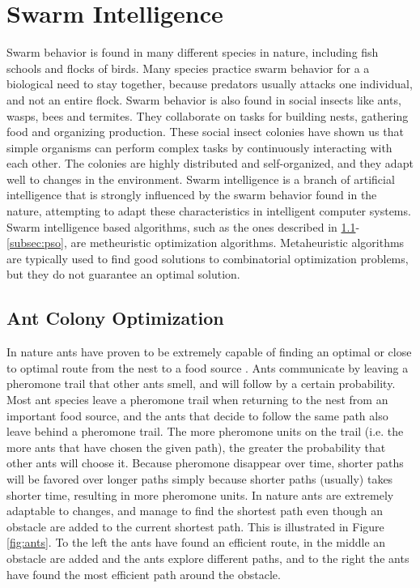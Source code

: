 \section{Swarm Intelligence}
\label{sec:swarmIntelligence}
Swarm behavior is found in many different species in nature, including fish schools and flocks of birds. Many species practice swarm behavior for a a biological need to stay together, because predators usually attacks one individual, and not an entire flock. Swarm behavior is also found in social insects like ants, wasps, bees and termites. They collaborate on tasks for building nests, gathering food and organizing production. These social insect colonies have shown us that simple organisms can perform complex tasks by continuously interacting with each other. The colonies are highly distributed and self-organized, and they adapt well to changes in the environment. Swarm intelligence \citep{beni89} is a branch of artificial intelligence that is strongly influenced by the swarm behavior found in the nature, attempting to adapt these characteristics in intelligent computer systems. Swarm intelligence based algorithms, such as the ones described in \ref{subsec:aco}-\ref{subsec:pso}, are metheuristic optimization algorithms. Metaheuristic algorithms are typically used to find good solutions to combinatorial optimization problems, but they do not guarantee an optimal solution. 

\subsection{Ant Colony Optimization}
\label{subsec:aco}
In nature ants have proven to be extremely capable of finding an optimal or close to optimal route from the nest to a food source \citep{deneubourg90}. Ants communicate by leaving a pheromone trail that other ants smell, and will follow by a certain probability. Most ant species leave a pheromone trail when returning to the nest from an important food source, and the ants that decide to follow the same path also leave behind a pheromone trail. The more pheromone units on the trail (i.e. the more ants that have chosen the given path), the greater the probability that other ants will choose it. Because pheromone disappear over time, shorter paths will be favored over longer paths simply because shorter paths (usually) takes shorter time, resulting in more pheromone units. In nature ants are extremely adaptable to changes, and manage to find the shortest path even though an obstacle are added to the current shortest path. This is illustrated in Figure \ref{fig:ants}. To the left the ants have found an efficient route, in the middle an obstacle are added and the ants explore different paths, and to the right the ants have found the most efficient path around the obstacle. 

